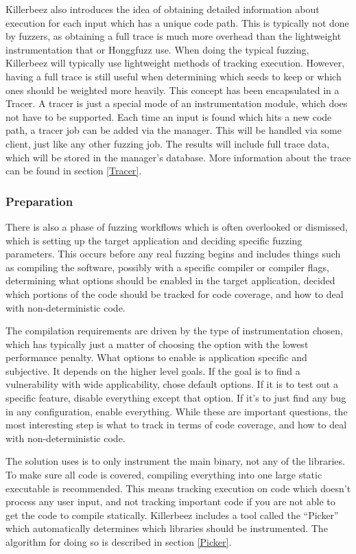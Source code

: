 \begin{multicols}{2}
Killerbeez also introduces the idea of obtaining detailed information about
execution for each input which has a unique code path.  This is typically
not done by fuzzers, as obtaining a full trace is much more overhead than
the lightweight instrumentation that \AFL{} or Honggfuzz use. When doing the
typical fuzzing, Killerbeez will typically use lightweight methods of tracking
execution. However, having a full trace is still useful when determining which
seeds to keep or which ones should be weighted more heavily. This concept has
been encapsulated in a Tracer. A tracer is just a special mode of an
instrumentation module, which does not have to be supported. Each time an input
is found which hits a new code path, a tracer job can be added via the manager.
This will be handled via some \BOINC{} client, just like any other fuzzing job.
The results will include full trace data, which will be stored in the manager's
database.  More information about the trace can be found in section
\ref{Tracer}.

\subsubsection{Preparation}  \label{Preparation Overview}
There is also a phase of fuzzing workflows which is often overlooked or
dismissed, which is setting up the target application and deciding specific
fuzzing parameters. This occurs before any real fuzzing begins and includes
things such as compiling the software, possibly with a specific compiler or
compiler flags, determining what options should be enabled in the target
application, decided which portions of the code should be tracked for code
coverage, and how to deal with non-deterministic code.

The compilation requirements are driven by the type of instrumentation chosen,
which has typically just a matter of choosing the option with the lowest
performance penalty. What options to enable is application specific and
subjective.  It depends on the higher level goals.  If the goal is to find a
vulnerability with wide applicability, chose default options. If it is to test
out a specific feature, disable everything except that option. If it's to just
find any bug in any configuration, enable everything.  While these are
important questions, the most interesting step is what to track in terms of
code coverage, and how to deal with non-deterministic code.

The solution \AFL{} uses is to only instrument the main binary, not any of the
libraries. To make sure all code is covered, compiling everything into one
large static executable is recommended. This means tracking execution on code
which doesn't process any user input, and not tracking important code if you
are not able to get the code to compile statically. Killerbeez includes a tool
called the ``Picker'' which automatically determines which libraries should be
instrumented.  The algorithm for doing so is described in section \ref{Picker}.


\end{multicols}

